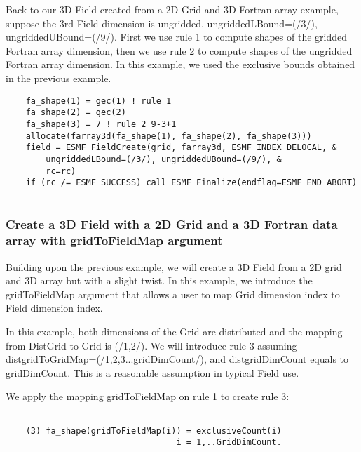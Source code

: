     Back to our 3D Field created from a 2D Grid and 3D Fortran array example, suppose the 3rd
    Field dimension is ungridded, ungriddedLBound=(/3/), ungriddedUBound=(/9/).
    First we use rule 1 to compute shapes of the gridded Fortran array dimension,
    then we use rule 2 to compute shapes of the ungridded Fortran array dimension.
    In this example, we used the exclusive bounds obtained in the previous
    example. 

 \begin{verbatim}
    fa_shape(1) = gec(1) ! rule 1
    fa_shape(2) = gec(2)
    fa_shape(3) = 7 ! rule 2 9-3+1
    allocate(farray3d(fa_shape(1), fa_shape(2), fa_shape(3)))
    field = ESMF_FieldCreate(grid, farray3d, ESMF_INDEX_DELOCAL, &
        ungriddedLBound=(/3/), ungriddedUBound=(/9/), &
        rc=rc)
    if (rc /= ESMF_SUCCESS) call ESMF_Finalize(endflag=ESMF_END_ABORT)
 
\end{verbatim}
 

  \subsubsection{Create a 3D Field with a 2D Grid and a 3D Fortran data array with gridToFieldMap argument}
  \label{sec:field:usage:create_2dgrid_3dptr_map}
  
    Building upon the previous example, we will create a 3D Field from
    a 2D grid and 3D array but with a slight twist. In this example, we
    introduce the gridToFieldMap argument that allows a user to map Grid 
    dimension index to Field dimension index.
  
    In this example, both dimensions of the Grid are distributed and the
    mapping from DistGrid to Grid is (/1,2/). We will introduce rule 3
    assuming distgridToGridMap=(/1,2,3...gridDimCount/), and distgridDimCount equals
    to gridDimCount. This is a reasonable assumption in typical Field use.
  
    We apply the mapping gridToFieldMap on rule 1 to create rule 3:
    \begin{verbatim}
   
    (3) fa_shape(gridToFieldMap(i)) = exclusiveCount(i)        
                                  i = 1,..GridDimCount.
   
    \end{verbatim}
  

